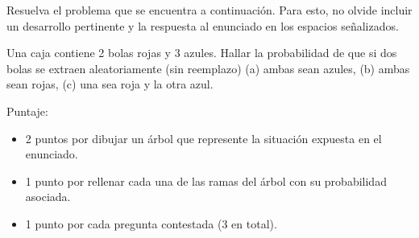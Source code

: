 \documentclass{cdplf-prueba}
\begin{document}
%
\begin{tcbraster}[enhanced,raster columns=3,raster width=\linewidth,raster column skip=3pt,raster force size=false]
    \begin{caja}[title={\sffamily\scshape\bfseries Nombre},height=30pt,add to width=4cm]
    \end{caja}
    \begin{caja}[title={\sffamily\scshape\bfseries Puntaje},height=30pt,add to width=-2cm]
    \end{caja}
    \begin{caja}[title={\sffamily\scshape\bfseries Nota},height=30pt,add to width=-2cm]
    \end{caja}                    
\end{tcbraster}
%
\vspace*{10pt}
\begin{tcolorbox}[boxrule=1pt,colback=white,leftrule=3mm]
    \raggedright Resuelva el problema que se encuentra a continuación. Para esto, no olvide 
    incluir un desarrollo pertinente y la respuesta al enunciado en los espacios señalizados.        
\end{tcolorbox}
%
Una caja contiene 2 bolas rojas y 3 azules. Hallar la probabilidad de que si 
dos bolas se extraen aleatoriamente (sin reemplazo) (a) ambas sean azules, 
(b) ambas sean rojas, (c) una sea roja y la otra azul.
\begin{desarrollo}[height=11cm]
\end{desarrollo}
\begin{respuesta}[height=3cm]
\end{respuesta}
{\setlength{\parskip}{0pt}
Puntaje:\begin{itemize}[nosep,topsep=0pt]
    \item 2 puntos por dibujar un árbol que represente la situación expuesta en el enunciado.
    \item 1 punto por rellenar cada una de las ramas del árbol con su probabilidad asociada.
    \item 1 punto por cada pregunta contestada (3 en total).
\end{itemize}}
\end{document}
